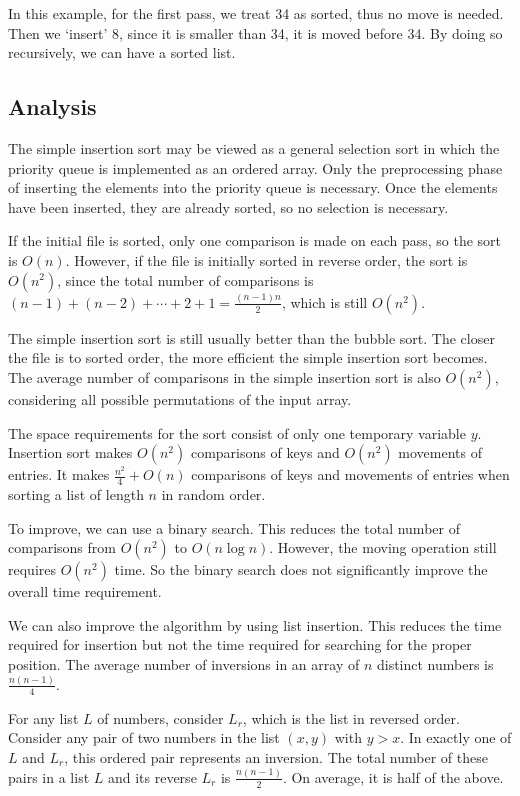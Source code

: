 In this example, for the first pass, we treat 34 as sorted, thus no move is needed. Then we `insert' 8, since it is smaller than 34, it is moved before 34. By doing so recursively, we can have a sorted list. 

\subsection{Analysis}
The simple insertion sort may be viewed as a general selection sort in which the priority queue is implemented as an ordered array. Only the preprocessing phase of inserting the elements into the priority queue is necessary. Once the elements have been inserted, they are already sorted, so no selection is necessary.

If the initial file is sorted, only one comparison is made on each pass, so the sort is \(O(n)\). However, if the file is initially sorted in reverse order, the sort is \(O(n^2)\), since the total number of comparisons is \((n - 1) + (n - 2) + \cdots + 2 + 1 = \frac{(n - 1)n}{2}\), which is still \(O(n^2)\).

The simple insertion sort is still usually better than the bubble sort. The closer the file is to sorted order, the more efficient the simple insertion sort becomes. The average number of comparisons in the simple insertion sort is also \(O(n^2)\), considering all possible permutations of the input array.

The space requirements for the sort consist of only one temporary variable \( y \). Insertion sort makes \( O(n^2) \) comparisons of keys and \( O(n^2) \) movements of entries. It makes \(\frac{n^2}{4} + O(n)\) comparisons of keys and movements of entries when sorting a list of length \( n \) in random order. 

To improve, we can use a binary search. This reduces the total number of comparisons from \( O(n^2) \) to \( O(n \log n) \). However, the moving operation still requires \( O(n^2) \) time. So the binary search does not significantly improve the overall time requirement. 

We can also improve the algorithm by using list insertion. This reduces the time required for insertion but not the time required for searching for the proper position. The average number of inversions in an array of \( n \) distinct numbers is \( \frac{n(n-1)}{4} \). 

For any list \( L \) of numbers, consider \( L_r \), which is the list in reversed order. Consider any pair of two numbers in the list \( (x, y) \) with \( y > x \). In exactly one of \( L \) and \( L_r \), this ordered pair represents an inversion. The total number of these pairs in a list \( L \) and its reverse \( L_r \) is \( \frac{n(n-1)}{2} \). On average, it is half of the above. 

